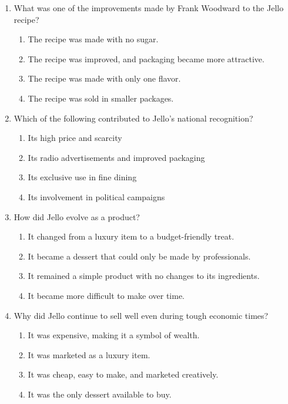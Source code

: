 \documentclass[12pt]{article}
\begin{document}
\begin{enumerate}
\vspace{0.5cm}

\item What was one of the improvements made by Frank Woodward to the Jello recipe?
\begin{enumerate}[label=\Alph*.]
    \item The recipe was made with no sugar.
    \item The recipe was improved, and packaging became more attractive.
    \item The recipe was made with only one flavor.
    \item The recipe was sold in smaller packages.
\end{enumerate}

\vspace{0.5cm}

\item Which of the following contributed to Jello’s national recognition?
\begin{enumerate}[label=\Alph*.]
    \item Its high price and scarcity
    \item Its radio advertisements and improved packaging
    \item Its exclusive use in fine dining
    \item Its involvement in political campaigns
\end{enumerate}

\vspace{0.5cm}

\item How did Jello evolve as a product?
\begin{enumerate}[label=\Alph*.]
    \item It changed from a luxury item to a budget-friendly treat.
    \item It became a dessert that could only be made by professionals.
    \item It remained a simple product with no changes to its ingredients.
    \item It became more difficult to make over time.
\end{enumerate}

\vspace{0.5cm}

\item Why did Jello continue to sell well even during tough economic times?
\begin{enumerate}[label=\Alph*.]
    \item It was expensive, making it a symbol of wealth.
    \item It was marketed as a luxury item.
    \item It was cheap, easy to make, and marketed creatively.
    \item It was the only dessert available to buy.
\end{enumerate}


\end{enumerate}
\end{document}
